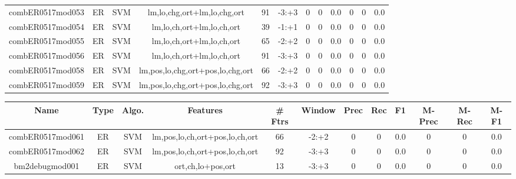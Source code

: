 \documentclass[a4paper]{article}
\begin{document}
\begin{landscape}
\begin{center}
\begin{tabular}{ |c|c|c|c|c|c|c|c|c|c|c|c|}
 
 	
 	\small{ combER0517mod053 } & ER & SVM & lm,lo,chg,ort+lm,lo,chg,ort  &  91 &  -3:+3  &  0 & 0 & 0.0  &  0 & 0 & 0.0 \\
 	

 
 	
 	\small{ combER0517mod054 } & ER & SVM & lm,lo,ch,ort+lm,lo,ch,ort  &  39 &  -1:+1  &  0 & 0 & 0.0  &  0 & 0 & 0.0 \\
 	

 
 	
 	\small{ combER0517mod055 } & ER & SVM & lm,lo,ch,ort+lm,lo,ch,ort  &  65 &  -2:+2  &  0 & 0 & 0.0  &  0 & 0 & 0.0 \\
 	

 
 	
 	\small{ combER0517mod056 } & ER & SVM & lm,lo,ch,ort+lm,lo,ch,ort  &  91 &  -3:+3  &  0 & 0 & 0.0  &  0 & 0 & 0.0 \\
 	

 
 	
 	\small{ combER0517mod058 } & ER & SVM & lm,pos,lo,chg,ort+pos,lo,chg,ort  &  66 &  -2:+2  &  0 & 0 & 0.0  &  0 & 0 & 0.0 \\
 	

 
 	
 	\small{ combER0517mod059 } & ER & SVM & lm,pos,lo,chg,ort+pos,lo,chg,ort  &  92 &  -3:+3  &  0 & 0 & 0.0  &  0 & 0 & 0.0 \\
 	
 \hline
\end{tabular}
\end{center}




\begin{center}
\begin{tabular}{ |c|c|c|c|c|c|c|c|c|c|c|c|} 
 \hline
 	Name & Type & Algo. & Features & \# Ftrs & Window & Prec & Rec & F1 & M-Prec & M-Rec & M-F1\\
 \hline

 	

 
 	
 	\small{ combER0517mod061 } & ER & SVM & lm,pos,lo,ch,ort+pos,lo,ch,ort  &  66 &  -2:+2  &  0 & 0 & 0.0  &  0 & 0 & 0.0 \\
 	

 
 	
 	\small{ combER0517mod062 } & ER & SVM & lm,pos,lo,ch,ort+pos,lo,ch,ort  &  92 &  -3:+3  &  0 & 0 & 0.0  &  0 & 0 & 0.0 \\
 	

 
 	
 	\small{ bm2debugmod001 } & ER & SVM & ort,ch,lo+pos,ort  &  13 &  -3:+3  &  0 & 0 & 0.0  &  0 & 0 & 0.0 \\
 	


\end{tabular}
\end{center}
\end{landscape}
\end{document}
